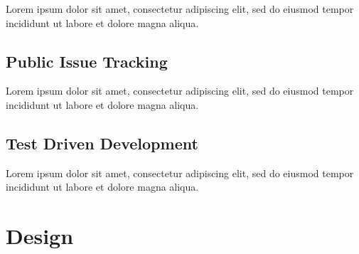 \documentclass[12pt, a4paper]{article}
\begin{document}
Lorem ipsum dolor sit amet, consectetur adipiscing elit, sed do eiusmod tempor incididunt ut labore et dolore magna aliqua.


\subsection{Public Issue Tracking}



Lorem ipsum dolor sit amet, consectetur adipiscing elit, sed do eiusmod tempor incididunt ut labore et dolore magna aliqua.


\subsection{Test Driven Development}

Lorem ipsum dolor sit amet, consectetur adipiscing elit, sed do eiusmod tempor incididunt ut labore et dolore magna aliqua.

\pagebreak


\section{Design}
\end{document}
